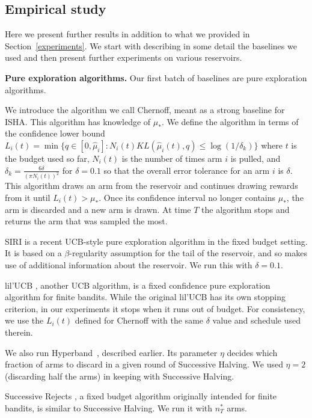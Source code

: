 \subsection {Empirical study}\label{appendix:experiments}

Here we present further results in addition to what we provided in Section~\ref{experiments}. We start with describing in some detail the baselines we used and then present further experiments on various reservoirs.

\textbf{Pure exploration algorithms.}
Our first batch of baselines are pure exploration algorithms.

We introduce the algorithm we call Chernoff, meant as a strong baseline
for ISHA. This algorithm has knowledge of $\mu_*$.
We define the algorithm in terms of the confidence lower bound $L_i(t) = \min \{q \in [0,\widehat{\mu}_{i}] : N_i(t) KL(\hat{\mu}_i(t),q) \le \log(1/\delta_k) \}\label{kl-ub}$
where $t$ is the budget used so far,
$N_i(t)$ is the number of times arm $i$ is pulled,
and $\delta_k = \frac{6\delta}{(\pi N_i(t))^2}$ for $\delta=0.1$ so that the overall error tolerance for an arm $i$ is $\delta$.
This algorithm draws an arm from the reservoir and continues drawing
rewards from it until $L_i(t) > \mu_*$. Once its confidence interval no longer contains $\mu_*$, the arm is discarded and a new arm is drawn.
At time $T$ the algorithm stops and returns the arm that was sampled the most. 

SIRI \citep{DBLP:journals/corr/CarpentierV15} is a recent UCB-style pure exploration algorithm in the fixed budget setting.
It is based on a $\beta$-regularity assumption for the tail of the
reservoir, and so makes use of additional information about the reservoir.
We run this with $\delta=0.1$.

lil'UCB \citep{Jamieson2014lilU}, another UCB algorithm, is a fixed confidence pure exploration algorithm for finite bandits. While the original lil'UCB has its own stopping criterion, in our experiments it stops when it runs out of budget. For consistency, we use the $L_i(t)$ defined for Chernoff with the same $\delta$ value and schedule used therein.

We also run Hyperband~\citep{li2017hyperband}, described earlier.
Its parameter $\eta$ decides which fraction of arms to discard in a given round of Successive Halving. We used $\eta=2$ (discarding half the arms) in keeping with Successive Halving.

Successive Rejects \citep{audibert2010best}, a fixed budget algorithm originally intended for finite bandits, is similar to Successive Halving. We run it with $n^*_T$ arms. 

